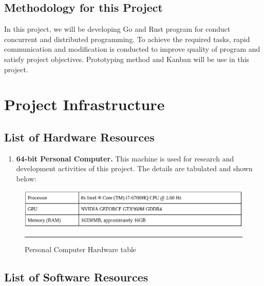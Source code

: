 \subsection{Methodology for this Project}

In this project, we will be developing Go and Rust program for conduct concurrent and distributed programming. To achieve the required tasks, rapid communication and modification is conducted to improve quality of program and satisfy project objectives. Prototyping method and Kanban will be use in this project.  

\pagebreak

\section{Project Infrastructure}

\subsection{List of Hardware Resources}

\begin{enumerate}[topsep=0pt,itemsep=-1ex,partopsep=1ex,parsep=1.5ex]
\item \textbf{64-bit Personal Computer.} This machine is used for research and development activities of this project. The details are tabulated and shown below: 

\end{enumerate}

\begin{figure}[H]
	\centering
	\includegraphics[width=1.0\textwidth]{Figure/computer-specs.png}
	\rule{35em}{0.5pt}
	\caption[Personal Computer Hardware table]{Personal Computer Hardware table}
\end{figure}

\subsection{List of Software Resources}

